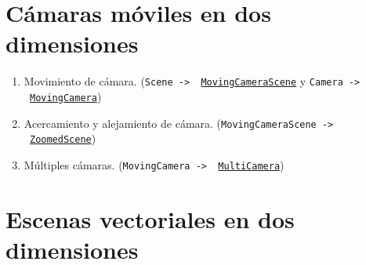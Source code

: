 \documentclass[a4paper]{article}
\begin{document}
\section{Cámaras móviles en dos dimensiones} \label{Sec: Cámaras móviles en dos dimensiones}

\begin{enumerate}

    \item Movimiento de cámara. (\texttt{Scene -> \ \href{https://docs.manim.community/en/v0.16.0.post0/reference/manim.scene.moving_camera_scene.MovingCameraScene.html?highlight=MovingCameraScene}{MovingCameraScene}} y \texttt{Camera -> \ \href{https://docs.manim.community/en/v0.16.0.post0/reference/manim.camera.moving_camera.MovingCamera.html?highlight=MovingCamera}{MovingCamera}})

    \item Acercamiento y alejamiento de cámara. (\texttt{MovingCameraScene -> \ \href{https://docs.manim.community/en/v0.16.0.post0/reference/manim.scene.zoomed_scene.ZoomedScene.html?highlight=ZoomedScene}{ZoomedScene}}) 

    \item Múltiples cámaras. (\texttt{MovingCamera -> \ \href{https://docs.manim.community/en/v0.16.0.post0/reference/manim.camera.multi_camera.MultiCamera.html?highlight=MultiCamera}{MultiCamera}})
\end{enumerate}

\section{Escenas vectoriales en dos dimensiones} \label{Sec: Escenas vectoriales en dos dimensiones}
\end{document}
